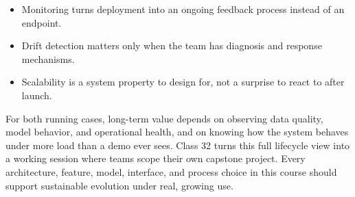 \classclosingframe
{\begin{itemize}
\item Monitoring turns deployment into an ongoing feedback process instead of an endpoint.
\item Drift detection matters only when the team has diagnosis and response mechanisms.
\item Scalability is a system property to design for, not a surprise to react to after launch.
\end{itemize}}
{For both running cases, long-term value depends on observing data quality, model behavior, and operational health, and on knowing how the system behaves under more load than a demo ever sees.}
{Class 32 turns this full lifecycle view into a working session where teams scope their own capstone project.}
{Every architecture, feature, model, interface, and process choice in this course should support sustainable evolution under real, growing use.}



